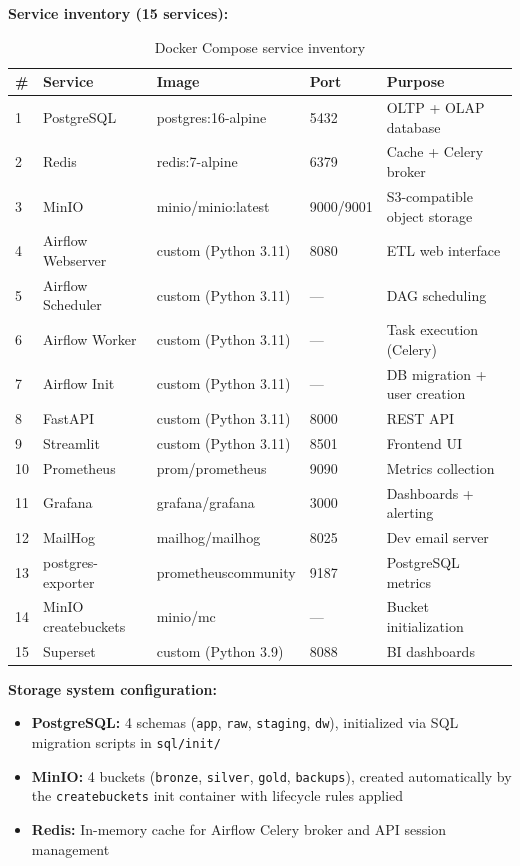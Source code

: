 \documentclass[a4paper,11pt,oneside,openany]{report}
\begin{document}
\textbf{Service inventory (15 services):}

\begin{table}[H]
\centering
\caption{Docker Compose service inventory}
\label{tab:services}
\begin{tabularx}{\textwidth}{C{0.5cm} L{3cm} L{2.5cm} C{1.5cm} L{4.5cm}}
\toprule
\textbf{\#} & \textbf{Service} & \textbf{Image} & \textbf{Port} & \textbf{Purpose} \\
 & PostgreSQL & postgres:16-alpine & 5432 & OLTP + OLAP database \\
2 & Redis & redis:7-alpine & 6379 & Cache + Celery broker \\
3 & MinIO & minio/minio:latest & 9000/9001 & S3-compatible object storage \\
4 & Airflow Webserver & custom (Python 3.11) & 8080 & ETL web interface \\
5 & Airflow Scheduler & custom (Python 3.11) & --- & DAG scheduling \\
6 & Airflow Worker & custom (Python 3.11) & --- & Task execution (Celery) \\
7 & Airflow Init & custom (Python 3.11) & --- & DB migration + user creation \\
8 & FastAPI & custom (Python 3.11) & 8000 & REST API \\
9 & Streamlit & custom (Python 3.11) & 8501 & Frontend UI \\
10 & Prometheus & prom/prometheus & 9090 & Metrics collection \\
11 & Grafana & grafana/grafana & 3000 & Dashboards + alerting \\
12 & MailHog & mailhog/mailhog & 8025 & Dev email server \\
13 & postgres-exporter & prometheuscommunity & 9187 & PostgreSQL metrics \\
14 & MinIO createbuckets & minio/mc & --- & Bucket initialization \\
15 & Superset & custom (Python 3.9) & 8088 & BI dashboards \\
\bottomrule
\end{tabularx}
\end{table}

\textbf{Storage system configuration:}
\begin{itemize}[nosep]
  \item \textbf{PostgreSQL:} 4 schemas (\texttt{app}, \texttt{raw}, \texttt{staging},
        \texttt{dw}), initialized via SQL migration scripts in \texttt{sql/init/}
  \item \textbf{MinIO:} 4 buckets (\texttt{bronze}, \texttt{silver}, \texttt{gold},
        \texttt{backups}), created automatically by the \texttt{createbuckets}
        init container with lifecycle rules applied
  \item \textbf{Redis:} In-memory cache for Airflow Celery broker and API
        session management
\end{itemize}
\end{document}
